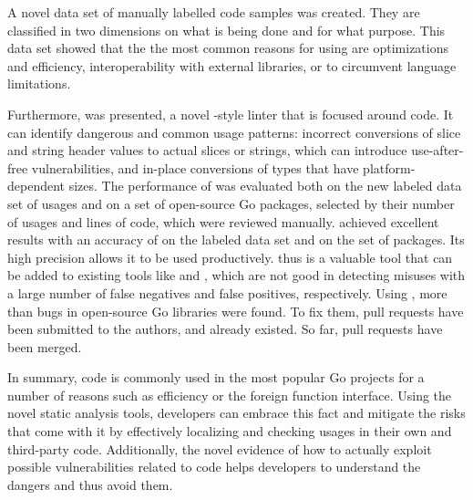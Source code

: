 A novel data set of \numberLabeledCodeSnippets{} manually labelled \unsafe{} code samples was created.
They are classified in two dimensions on what is being done and for what purpose.
This data set showed that the the most common reasons for using \unsafe{} are optimizations and efficiency,
interoperability with external libraries, or to circumvent language limitations.

Furthermore, \toolSafer{} was presented, a novel \toolVet{}-style linter that is focused around \unsafe{} code.
It can identify  dangerous and common usage patterns: incorrect conversions of slice and string header
values to actual slices or strings, which can introduce use-after-free vulnerabilities, and in-place conversions of
types that have platform-dependent sizes.
The performance of \toolSafer{} was evaluated both on the new labeled data set of \unsafe{} usages and on a set of
open-source Go packages, selected by their number of \unsafe{} usages and lines of code, which were reviewed manually.
\toolSafer{} achieved excellent results with an accuracy of \goSaferEvaluationDatasetGosaferAccuracy{} on the labeled
data set and \goSaferEvaluationPackagesGosaferAccuracy{} on the set of packages.
Its high precision allows it to be used productively.
\toolSafer{} thus is a valuable tool that can be added to existing tools like \toolVet{} and \toolGosec{}, which are
not good in detecting \unsafe{} misuses with a large number of false negatives and false positives, respectively.
Using \toolSafer{}, more than \numberBugsFixedRounded{} bugs in open-source Go libraries were found.
To fix them, \numberPRs{} pull requests have been submitted to the authors, and  already existed.
So far, \numberPRsMerged{} pull requests have been merged.

In summary, \unsafe{} code is commonly used in the most popular Go projects for a number of reasons such as efficiency
or the foreign function interface.
Using the novel static analysis tools, developers can embrace this fact and mitigate the risks that come with it by
effectively localizing and checking \unsafe{} usages in their own and third-party code.
Additionally, the novel evidence of how to actually exploit possible vulnerabilities related to \unsafe{} code helps
developers to understand the dangers and thus avoid them.
